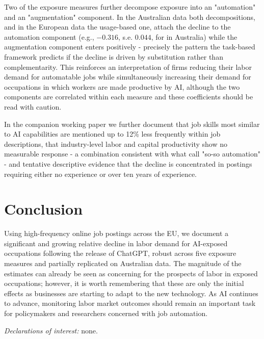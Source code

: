 \documentclass[11pt]{article}
\begin{document}
Two of the exposure measures further decompose exposure into an "automation" and an "augmentation" component. In the Australian data both decompositions, and in the European data the usage-based one, attach the decline to the automation component (e.g., $-0.316$, s.e. $0.044$, for \citet{handa2025economic} in Australia) while the augmentation component enters positively - precisely the pattern the task-based framework predicts if the decline is driven by substitution rather than complementarity. This reinforces an interpretation of firms reducing their labor demand for automatable jobs while simultaneously increasing their demand for occupations in which workers are made productive by AI, although the two components are correlated within each measure and these coefficients should be read with caution.

In the companion working paper we further document that job skills most similar to AI capabilities are mentioned up to 12\% less frequently within job descriptions, that industry-level labor and capital productivity show no measurable response - a combination consistent with what \citet{acemoglu_automation_2019} call "so-so automation" - and tentative descriptive evidence that the decline is concentrated in postings requiring either no experience or over ten years of experience.

\section{Conclusion}

Using high-frequency online job postings across the EU, we document a significant and growing relative decline in labor demand for AI-exposed occupations following the release of ChatGPT, robust across five exposure measures and partially replicated on Australian data. The magnitude of the estimates can already be seen as concerning for the prospects of labor in exposed occupations; however, it is worth remembering that these are only the initial effects as businesses are starting to adapt to the new technology. As AI continues to advance, monitoring labor market outcomes should remain an important task for policymakers and researchers concerned with job automation.

\vspace{1em}
\noindent\textit{Declarations of interest:} none.

\clearpage

\end{document}
